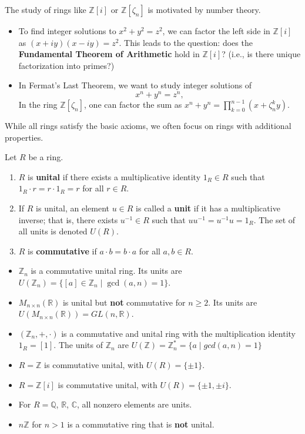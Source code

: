 \begin{remark}[Motivation]
The study of rings like $\mathbb{Z}[i]$ or $\mathbb{Z}[\zeta_n]$ is motivated by number theory.
\begin{itemize}
    \item To find integer solutions to $x^2 + y^2 = z^2$, we can factor the left side in $\mathbb{Z}[i]$ as $(x+iy)(x-iy) = z^2$. This leads to the question: does the \textbf{Fundamental Theorem of Arithmetic} hold in $\mathbb{Z}[i]$? (i.e., is there unique factorization into primes?)
    \item In Fermat's Last Theorem, we want to study integer solutions of 
    $$x^n + y^n = z^n,$$ 
    In the ring $\mathbb{Z}[\zeta_n]$, one can factor the sum as $x^n + y^n = \prod_{k=0}^{n-1} (x + \zeta_n^k y)$.
\end{itemize}
\end{remark}


While all rings satisfy the basic axioms, we often focus on rings with additional properties.
\begin{definition}
Let $R$ be a ring.
\begin{enumerate}
    \item $R$ is \textbf{unital} if there exists a multiplicative identity $1_R \in R$ such that $1_R \cdot r = r \cdot 1_R = r$ for all $r \in R$.
    \item If $R$ is unital, an element $u \in R$ is called a \textbf{unit} if it has a multiplicative inverse; that is, there exists $u^{-1} \in R$ such that $u u^{-1} = u^{-1} u = 1_R$. The set of all units is denoted $U(R)$.
    \item $R$ is \textbf{commutative} if $a \cdot b = b \cdot a$ for all $a, b \in R$.
\end{enumerate}
\end{definition}

\begin{example}
\begin{itemize}
    \item $\mathbb{Z}_n$ is a commutative unital ring. Its units are $U(\mathbb{Z}_n) = \{ [a] \in \mathbb{Z}_n \mid \gcd(a, n) = 1 \}$.
    \item $M_{n \times n}(\mathbb{R})$ is unital but \textbf{not} commutative for $n \ge 2$. Its units are $U(M_{n \times n}(\mathbb{R})) = GL(n, \mathbb{R})$.
    \item $(\mathbb{Z}_n,+,\cdot)$ is a commutative and unital ring with the multiplication identity $1_R=[1]$. The units of $\mathbb{Z}_n$ are $U(\mathbb{Z})=\mathbb{Z}_n^*=\{a\mid gcd(a,n)=1\}$
    \item $R = \mathbb{Z}$ is commutative unital, with $U(R) = \{ \pm 1 \}$.
    \item $R = \mathbb{Z}[i]$ is commutative unital, with $U(R) = \{ \pm 1, \pm i \}$.
    \item For $R =\mathbb{Q}$, $\mathbb{R}$, $\mathbb{C}$, all nonzero elements are units.
    \item $n\mathbb{Z}$ for $n > 1$ is a commutative ring that is \textbf{not} unital.
\end{itemize}
\end{example}


